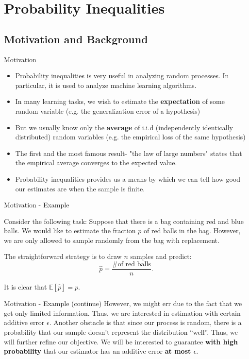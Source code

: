 \documentclass[11pt, usenames, dvipsnames]{beamer}
\begin{document}
\section{Probability Inequalities}
\subsection{Motivation and Background}

\begin{frame}{Motivation}
\begin{itemize}
    \item Probability inequalities is very useful in analyzing random processes. In particular, it is used to analyze machine learning algorithms.
    \pause
    \item In many learning tasks, we wish to estimate the \textbf{expectation} of some random variable (e.g. the generalization error of a hypothesis)
    \pause
    \item But we usually know only the \textbf{average} of i.i.d (independently identically distributed) random variables (e.g. the empirical loss of the same hypothesis)
    \pause
    \item The first and the most famous result- "the law of large numbers" states that the empirical average converges to the expected value.
    \pause
    \item Probability inequalities provides us a means by which we can tell how good our estimates are when the sample is finite.
\end{itemize}
\end{frame}

\begin{frame}{Motivation - Example}
    \begin{example}
    Consider the following task: Suppose that there is a bag containing red and blue balls.  We would like to estimate the fraction $p$ of red balls in the bag. However, we are only allowed to sample randomly from the bag with replacement.
    \end{example}
    \pause
    \begin{solution}
    The straightforward strategy is to draw $n$ samples and predict: 
    $$\hat{p} = \frac{\# \text{of red balls}}{n}.$$
    \end{solution}
    \pause
    It is clear that $\mathbb{E}[\hat{p}] = p$.
\end{frame}

\begin{frame}{Motivation - Example (continue)}
    However, we might err due to the fact that we get only limited information. Thus, we are interested in estimation with certain additive error $\epsilon$. Another obstacle is that since our process is random, there is a probability that our sample doesn't represent the distribution ``well''. Thus, we will further refine our objective. We will be interested to guarantee \textbf{with high probability} that our estimator has an additive error \textbf{at most $\epsilon$}. 
    
\end{frame}
\end{document}
